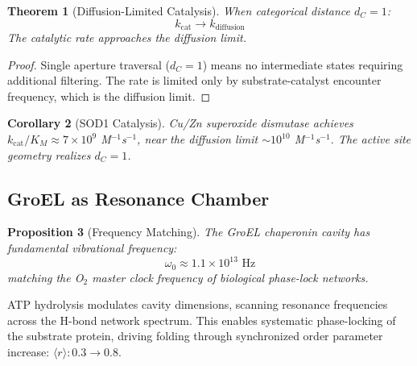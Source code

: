 \documentclass[twocolumn,amsmath,amssymb,aps,prl,superscriptaddress]{revtex4-2}
\newtheorem{theorem}{Theorem}[section]
\newtheorem{proposition}[theorem]{Proposition}
\newtheorem{corollary}[theorem]{Corollary}
\newcommand{\orderp}{\langle r \rangle}
\begin{document}
\begin{theorem}[Diffusion-Limited Catalysis]
\label{thm:catalysis}
When categorical distance $d_C = 1$:
\begin{equation}
\boxed{k_{\text{cat}} \to k_{\text{diffusion}}}
\end{equation}
The catalytic rate approaches the diffusion limit.
\end{theorem}

\begin{proof}
Single aperture traversal ($d_C = 1$) means no intermediate states requiring additional filtering. The rate is limited only by substrate-catalyst encounter frequency, which is the diffusion limit.
\end{proof}

\begin{corollary}[SOD1 Catalysis]
Cu/Zn superoxide dismutase achieves $k_{\text{cat}}/K_M \approx 7 \times 10^9$ M$^{-1}$s$^{-1}$, near the diffusion limit $\sim 10^{10}$ M$^{-1}$s$^{-1}$. The active site geometry realizes $d_C = 1$.
\end{corollary}

\subsection{GroEL as Resonance Chamber}

\begin{proposition}[Frequency Matching]
The GroEL chaperonin cavity has fundamental vibrational frequency:
\begin{equation}
\omega_0 \approx 1.1 \times 10^{13} \text{ Hz}
\end{equation}
matching the O$_2$ master clock frequency of biological phase-lock networks.
\end{proposition}

ATP hydrolysis modulates cavity dimensions, scanning resonance frequencies across the H-bond network spectrum. This enables systematic phase-locking of the substrate protein, driving folding through synchronized order parameter increase: $\orderp: 0.3 \to 0.8$.
\end{document}
